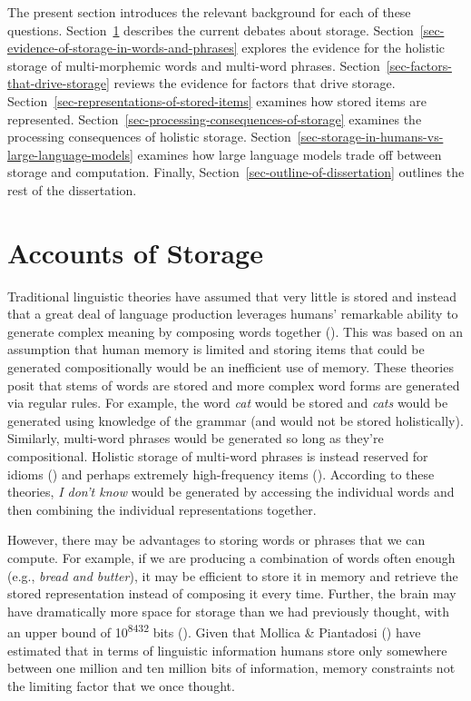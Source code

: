 \documentclass[
  12pt,
  letterpaper,
]{scrreprt}
\begin{document}
The present section introduces the relevant background for each of these
questions. Section~\ref{sec-accounts-of-storage} describes the current
debates about storage.
Section~\ref{sec-evidence-of-storage-in-words-and-phrases} explores the
evidence for the holistic storage of multi-morphemic words and
multi-word phrases. Section~\ref{sec-factors-that-drive-storage} reviews
the evidence for factors that drive storage.
Section~\ref{sec-representations-of-stored-items} examines how stored
items are represented.
Section~\ref{sec-processing-consequences-of-storage} examines the
processing consequences of holistic storage.
Section~\ref{sec-storage-in-humans-vs-large-language-models} examines
how large language models trade off between storage and computation.
Finally, Section~\ref{sec-outline-of-dissertation} outlines the rest of
the dissertation.

\section{Accounts of Storage}\label{sec-accounts-of-storage}

Traditional linguistic theories have assumed that very little is stored
and instead that a great deal of language production leverages humans'
remarkable ability to generate complex meaning by composing words
together (). This was based on
an assumption that human memory is limited and storing items that could
be generated compositionally would be an inefficient use of memory.
These theories posit that stems of words are stored and more complex
word forms are generated via regular rules. For example, the word
\emph{cat} would be stored and \emph{cats} would be generated using
knowledge of the grammar (and would not be stored holistically).
Similarly, multi-word phrases would be generated so long as they're
compositional. Holistic storage of multi-word phrases is instead
reserved for idioms () and
perhaps extremely high-frequency items (). According to these theories, \emph{I don't know}
would be generated by accessing the individual words and then combining
the individual representations together.

However, there may be advantages to storing words or phrases that we can
compute. For example, if we are producing a combination of words often
enough (e.g., \emph{bread and butter}), it may be efficient to store it
in memory and retrieve the stored representation instead of composing it
every time. Further, the brain may have dramatically more space for
storage than we had previously thought, with an upper bound of
10\textsuperscript{8432} bits
().
Given that Mollica \& Piantadosi
() have estimated
that in terms of linguistic information humans store only somewhere
between one million and ten million bits of information, memory
constraints not the limiting factor that we once thought.
\end{document}
